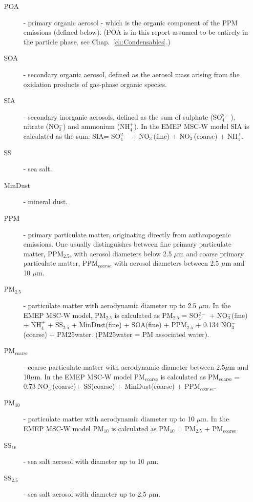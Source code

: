 \begin{description}

\item[POA] - primary organic aerosol - which is the organic component of
the PPM emissions (defined below). (POA is in this report assumed to
be entirely in the particle phase, see Chap.~\ref{ch:Condensables}.)
  
\item[SOA] - secondary organic aerosol, defined as the aerosol mass
  arising from the oxidation products of gas-phase organic species.

\item[SIA]- secondary inorganic aerosols, defined as the sum of
  sulphate (SO$^{2-}_4$), nitrate (NO$^-_3$) and ammonium (NH$^+_4$).
  In the EMEP MSC-W model SIA is calculated as the sum: SIA= SO$^{2-}_4$
  + NO$^-_3$(fine) + NO$^-_3$(coarse) + NH$^+_4$.

\item[SS] - sea salt.

\item[MinDust] - mineral dust.

\item[PPM] - primary particulate matter, originating directly from
  anthropogenic emissions. One usually distinguishes between fine
  primary particulate matter, PPM$_{2.5}$, with aerosol diameters
  below 2.5 $\mu$m and coarse primary particulate matter, PPM$_{coarse}$
  with aerosol diameters between 2.5 $\mu$m and 10 $\mu$m.

\item[PM$_{2.5}$] - particulate matter with aerodynamic diameter
  up to 2.5 $\mu$m. In the EMEP
  MSC-W model, PM$_{2.5}$ is calculated as PM$_{2.5}$ = SO$^{2-}_4$
  + NO$^-_3$(fine) + NH$^+_4$ + SS$_{2.5}$ + MinDust(fine)
  + SOA(fine) + PPM$_{2.5}$ + 0.134 NO$^-_3$(coarse) + PM25water.
  (PM25water = PM associated water).

\item[PM$_{\text{coarse}}$] - coarse particulate matter with aerodynamic
  diameter between 2.5$\mu$m 
  and 10$\mu$m. In the EMEP MSC-W model PM$_{\text{coarse}}$ is calculated
  as PM$_{\text{coarse}}$ = 0.73 NO$^-_3$(coarse)+ SS(coarse)
  + MinDust(coarse) + PPM$_{coarse}$.

\item[PM$_{10}$] - particulate matter with aerodynamic diameter
  up to 10 $\mu$m. In the EMEP
   MSC-W model PM$_{10}$ is calculated as PM$_{10}$ = PM$_{2.5}$
  + PM$_{\text{coarse}}$.

\item[SS$_{10}$]  - sea salt aerosol with diameter
  up to 10 $\mu$m.
  
\item[SS$_{2.5}$]  - sea salt aerosol with diameter
  up to 2.5 $\mu$m.

\end{description}

